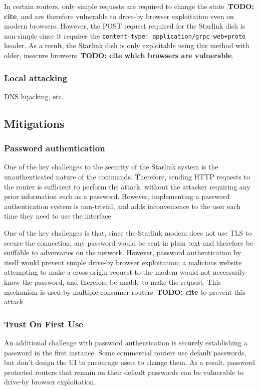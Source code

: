 In certain routers, only simple requests are required to change the state~\textbf{TODO: cite}, and are therefore vulnerable to drive-by browser exploitation even on modern browsers.
However, the POST request required for the Starlink dish is non-simple since it requires the \texttt{content-type: application/grpc-web+proto} header.
As a result, the Starlink dish is only exploitable using this method with older, insecure browsers~\textbf{TODO: cite which browsers are vulnerable}.

\subsubsection{Local attacking}

DNS hijacking, etc.

\subsection{Mitigations}

\subsubsection{Password authentication}

One of the key challenges to the security of the Starlink system is the unauthenticated nature of the commands.
Therefore, sending HTTP requests to the router is sufficient to perform the attack, without the attacker requiring any prior information such as a password.
However, implementing a password authentication system is non-trivial, and adds inconvenience to the user each time they need to use the interface.

One of the key challenges is that, since the Starlink modem does not use TLS to secure the connection, any password would be sent in plain text and therefore be sniffable to adversaries on the network.
However, password authentication by itself would prevent simple drive-by browser exploitation; a malicious website attempting to make a cross-origin request to the modem would not necessarily know the password, and therefore be unable to make the request.
This mechanism is used by multiple consumer routers~\textbf{TODO: cite} to prevent this attack.

\subsubsection{Trust On First Use}

An additional challenge with password authentication is securely establishing a password in the first instance.
Some commercial routers use default passwords, but don't design the UI to encourage users to change them.
As a result, password protected routers that remain on their default passwords can be vulnerable to drive-by browser exploitation.

